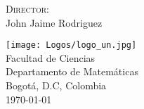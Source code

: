 \documentclass[12pt]{book}
\begin{document}
\renewcommand{\contentsname}{\vspace{0cm} Contenido \vspace{-2cm}}
\begin{titlepage}
\vspace*{2cm}
\noindent
{}

\vspace*{2cm}
\begin{minipage}{\linewidth}

\centering \scshape \printauthor
\vspace*{2cm}

\textsc{Director:}\\
\vspace{0.1cm}
John Jaime Rodriguez\\
\vspace{2.5cm}

\texttt{[image: Logos/logo\_un.jpg]}\\
\fontsize{13pt}{13pt}\selectfont   Facultad de Ciencias\\
\vspace{0.1cm}
Departamento de Matemáticas\\
\vspace{0.1cm}
Bogotá, D.C, Colombia\\
\vspace{0.1cm}
\today
\end{minipage}
\end{titlepage}


\newpage




%



\let\cleardoublepage=\clearpage
\tableofcontents
\thispagestyle{empty}
\blankpages
\geomdoc %
\end{document}
